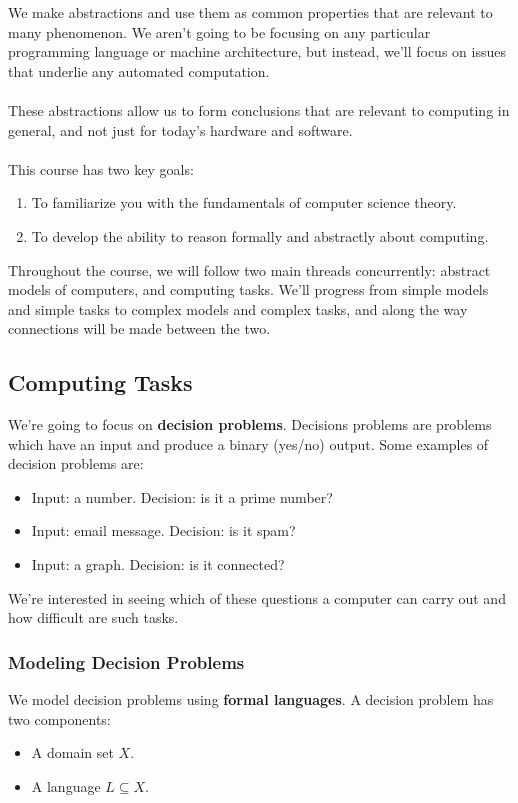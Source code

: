 \documentclass[]{article}
\theoremstyle{definition}
\begin{document}
      We make abstractions and use them as common properties that are relevant to many phenomenon. We aren't going to be focusing on any particular programming language or machine architecture, but instead, we'll focus on issues that underlie any automated computation.
      \\ \\
      These abstractions allow us to form conclusions that are relevant to computing in general, and not just for today's hardware and software.
      \\ \\
      This course has two key goals:
      \begin{enumerate}
        \item To familiarize you with the fundamentals of computer science theory.
        \item To develop the ability to reason formally and abstractly about computing.
      \end{enumerate}

    Throughout the course, we will follow two main threads concurrently: abstract models of computers, and computing tasks. We'll progress from simple models and simple tasks to complex models and complex tasks, and along the way connections will be made between the two.

    \subsection{Computing Tasks}
      We're going to focus on \textbf{decision problems}. Decisions problems are problems which have an input and produce a binary (yes/no) output. Some examples of decision problems are:
      \begin{itemize}
        \item Input: a number. Decision: is it a prime number?
        \item Input: email message. Decision: is it spam?
        \item Input: a graph. Decision: is it connected?
      \end{itemize}

      We're interested in seeing which of these questions a computer can carry out and how difficult are such tasks.

      \subsubsection{Modeling Decision Problems}
        We model decision problems using \textbf{formal languages}. A decision problem has two components:
        \begin{itemize}
          \item A domain set $X$.
          \item A language $L \subseteq X$.
        \end{itemize}
\end{document}
